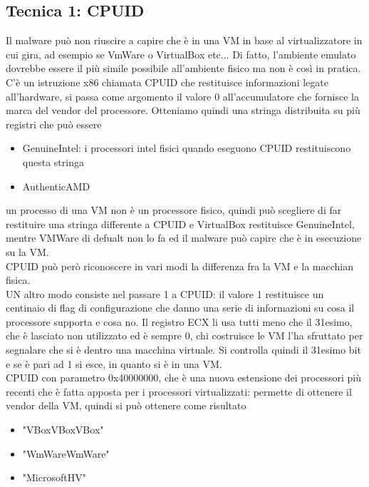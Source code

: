 \documentclass[12pt, oneside]{extbook}
\begin{document}
\subsection{Tecnica 1: CPUID}
Il malware può non riuscire a capire che è in una VM in base al virtualizzatore in cui gira, ad esempio se VmWare o VirtualBox etc... Di fatto, l'ambiente emulato dovrebbe essere il più simile possibile all'ambiente fisico ma non è così in pratica.\\C'è un istruzione x86 chiamata CPUID che restituisce informazioni legate all'hardware, si passa come argomento il valore 0 all'accumulatore che fornisce la marca del vendor del processore. Otteniamo quindi una stringa distribuita su più registri che può essere
\begin{itemize}
\item GenuineIntel: i processori intel fisici quando eseguono CPUID restituiscono questa stringa
\item AuthenticAMD
\end{itemize}
un processo di una VM non è un processore fisico, quindi può scegliere di far restituire una stringa differente a CPUID e VirtualBox restituisce GenuineIntel, mentre VMWare di defualt non lo fa ed il malware può capire che è in esecuzione su la VM.\\CPUID può però riconoscere in vari modi la differenza fra la VM e la macchian fisica.\\UN altro modo consiste nel passare 1 a CPUID: il valore 1 restituisce un centinaio di flag di configurazione che danno una serie di informazioni su cosa il processore supporta e cosa no. Il registro ECX li usa tutti meno che il 31esimo, che è lasciato non utilizzato ed è sempre 0, chi costruisce le VM l'ha sfruttato per segnalare che si è dentro una macchina virtuale. Si controlla quindi il 31esimo bit e se è pari ad 1 si esce, in quanto si è in una VM.\\CPUID con parametro 0x40000000, che è una nuova estensione dei processori più recenti che è fatta apposta per i processori virtualizzati: permette di ottenere il vendor della VM, quindi si può ottenere come risultato
\begin{itemize}
\item "VBoxVBoxVBox"
\item "WmWareWmWare"
\item "MicrosoftHV"
\end{itemize}
\end{document}
